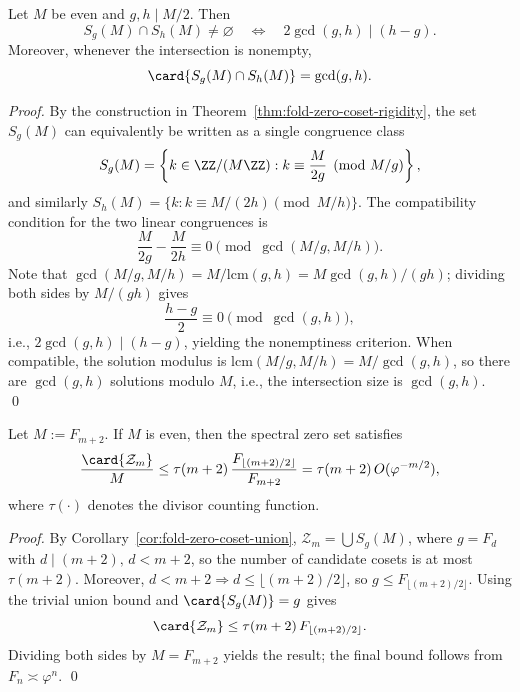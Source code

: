 \begin{lemma}\label{lem:fold-zero-coset-intersection}
Let \(M\) be even and \(g,h\mid M/2\).
Then
\[
S_g(M)\cap S_h(M)\neq\varnothing
\quad\Longleftrightarrow\quad
2\gcd(g,h)\mid (h-g).
\]
Moreover, whenever the intersection is nonempty,
\[
\card{S_g(M)\cap S_h(M)}=\gcd(g,h).
\]
\end{lemma}

\begin{proof}
By the construction in Theorem~\ref{thm:fold-zero-coset-rigidity}, the set \(S_g(M)\) can equivalently be written as a single congruence class
\[
S_g(M)=\left\{k\in\ZZ/(M\ZZ): k\equiv \frac{M}{2g}\pmod{M/g}\right\},
\]
and similarly
\(
S_h(M)=\{k: k\equiv M/(2h)\pmod{M/h}\}
\).
The compatibility condition for the two linear congruences is
\[
\frac{M}{2g}-\frac{M}{2h}\equiv 0\pmod{\gcd(M/g,M/h)}.
\]
Note that \(\gcd(M/g,M/h)=M/\mathrm{lcm}(g,h)=M\gcd(g,h)/(gh)\); dividing both sides by \(M/(gh)\) gives
\[
\frac{h-g}{2}\equiv 0\pmod{\gcd(g,h)},
\]
i.e., \(2\gcd(g,h)\mid(h-g)\), yielding the nonemptiness criterion.
When compatible, the solution modulus is \(\mathrm{lcm}(M/g,M/h)=M/\gcd(g,h)\), so there are \(\gcd(g,h)\) solutions modulo \(M\), i.e., the intersection size is \(\gcd(g,h)\). \qed
\end{proof}

\begin{theorem}\label{thm:fold-zero-density-sparse}
Let \(M:=F_{m+2}\). If \(M\) is even, then the spectral zero set satisfies
\[
\frac{\card{\mathcal{Z}_m}}{M}
\le
\tau(m+2)\,\frac{F_{\lfloor (m+2)/2\rfloor}}{F_{m+2}}
=\tau(m+2)\,O(\varphi^{-m/2}),
\]
where \(\tau(\cdot)\) denotes the divisor counting function.
\end{theorem}

\begin{proof}
By Corollary~\ref{cor:fold-zero-coset-union}, \(\mathcal{Z}_m=\bigcup S_{g}(M)\), where \(g=F_d\) with \(d\mid(m+2),\,d<m+2\), so the number of candidate cosets is at most \(\tau(m+2)\).
Moreover, \(d<m+2\Rightarrow d\le \lfloor (m+2)/2\rfloor\), so \(g\le F_{\lfloor (m+2)/2\rfloor}\).
Using the trivial union bound and \(\card{S_g(M)}=g\) gives
\[
\card{\mathcal{Z}_m}\le \tau(m+2)\,F_{\lfloor (m+2)/2\rfloor}.
\]
Dividing both sides by \(M=F_{m+2}\) yields the result; the final bound follows from \(F_n\asymp \varphi^n\). \qed
\end{proof}
